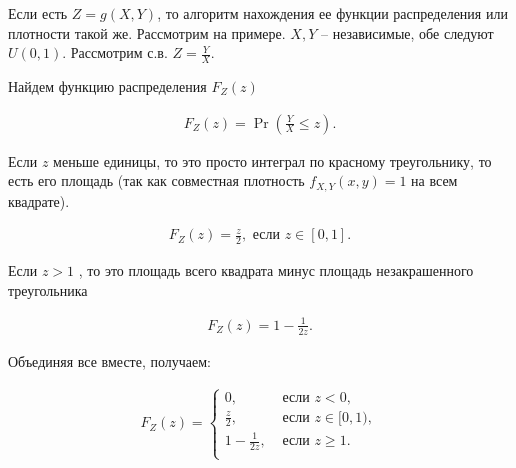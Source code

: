\documentclass[12pt]{article}
\begin{document}
Если есть $Z = g(X, Y)$, то алгоритм нахождения ее функции распределения или плотности такой же. Рассмотрим на примере. $X, Y$ -- независимые, обе следуют $U(0, 1)$. Рассмотрим с.в. $Z = \frac{Y}{X}$.

Найдем функцию распределения $F_Z(z)$

\begin{align*}
  F_Z(z) = \Pr(\frac{Y}{X} \le z).
\end{align*}


\begin{center}
\end{center}

Если $z$ меньше единицы, то это просто интеграл по красному треугольнику, то есть его площадь (так как совместная плотность $f_{X, Y}(x, y) = 1$ на всем квадрате).

\begin{align*}
  F_Z(z) = \frac{z}{2}, \text{ если } z \in [0, 1].
\end{align*}

Если $z > 1$ , то это площадь всего квадрата минус площадь незакрашенного треугольника

\begin{align*}
  F_Z(z) = 1 - \frac{1}{2z}.
\end{align*}

Объединяя все вместе, получаем:

\begin{align*}
  F_Z(z) = \begin{cases}
    0, &\text{ если } z < 0, \\
    \frac{z}{2}, &\text{ если } z \in [0, 1), \\
    1 - \frac{1}{2z}, &\text{ если } z \ge 1. \\
  \end{cases}
\end{align*}
\end{document}
